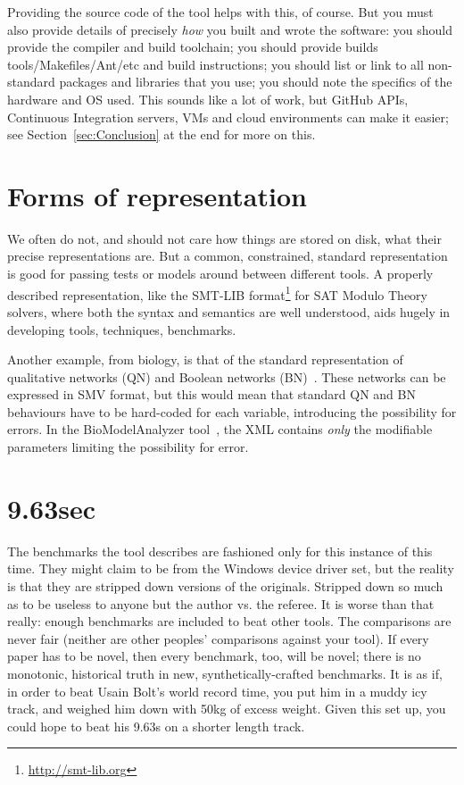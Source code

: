 \documentclass[conference]{IEEEtran}
\begin{document}
Providing the source code of the tool helps with this, of course. But
you must also provide details of precisely \emph{how} you built and
wrote the software:
%
you should provide the compiler and build toolchain; 
%
you should provide builds tools/Makefiles/Ant/etc and build instructions; 
%
you should list or link to all non-standard packages and libraries that you use; 
%
you should note the specifics of the hardware and OS used. 
%
This sounds like a lot of work, but GitHub APIs, Continuous
Integration servers, VMs and cloud environments can make it easier; see
Section~\ref{sec:Conclusion} at the end for more on this.


\section{Forms of representation}

We often do not, and should not care how things are stored on disk,
what their precise representations are. But a common, constrained, standard
representation is good for passing tests or models around between
different tools. A properly described representation, like the SMT-LIB
format\footnote{\url{http://smt-lib.org}} for SAT Modulo Theory
solvers, where both the syntax and semantics are well understood, aids
hugely in developing tools, techniques, benchmarks.

Another example, from biology, is that of the standard representation
of qualitative networks (QN) and Boolean
networks (BN)~\cite{Kauffman1969,Schaub2007}.  These networks can be
expressed in SMV format, but this would mean that standard QN and BN
behaviours have to be hard-coded for each variable, introducing the
possibility for errors. In the BioModelAnalyzer
tool~\cite{Benque2012}, the XML contains \emph{only} the modifiable
parameters limiting the possibility for error.


\section{9.63sec} 

The benchmarks the tool describes are fashioned only for this instance
of this time. They might claim to be from the Windows device driver
set, but the reality is that they are stripped down versions of the
originals. Stripped down so much as to be useless to anyone but the
author vs. the referee. It is worse than that really: enough
benchmarks are included to beat other tools. The comparisons are never
fair (neither are other peoples' comparisons against your tool). If
every paper has to be novel, then every benchmark, too, will be novel;
there is no monotonic, historical truth in new, synthetically-crafted
benchmarks. It is as if, in order to beat Usain Bolt's world record
time, you put him in a muddy icy track, and weighed him down with 50kg
of excess weight. Given this set up, you could hope to beat his 9.63s
on a shorter length track.
\end{document}
